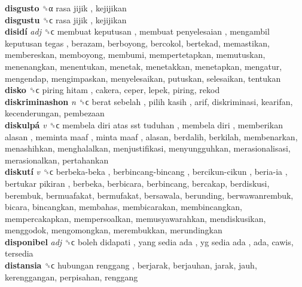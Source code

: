 \textbf{disgusto} ␝α   rasa jijik , kejijikan  \\
\textbf{disgustu} ␝ϲ   rasa jijik , kejijikan  \\
\textbf{disidí} \emph{adj}  ␝ϲ   membuat keputusan ,  membuat penyelesaian ,  mengambil keputusan tegas , berazam, berboyong, bercokol, bertekad, memastikan, membereskan, memboyong, membumi, mempertetapkan, memutuskan, menenangkan, menentukan, menetak, menetakkan, menetapkan, mengatur, mengendap, mengimpaskan, menyelesaikan, putuskan, selesaikan, tentukan  \\
\textbf{disko} ␝ϲ   piring hitam , cakera, ceper, lepek, piring, rekod  \\
\textbf{diskriminashon} \emph{n}  ␝ϲ   berat sebelah ,  pilih kasih , arif, diskriminasi, kearifan, kecenderungan, pembezaan  \\
\textbf{diskulpá} \emph{v}  ␝ϲ   membela diri  atas sst tuduhan ,  membela diri ,  memberikan alasan ,  meminta maaf ,  minta maaf , alasan, berdalih, berkilah, membenarkan, menashihkan, menghalalkan, menjustifikasi, menyungguhkan, merasionalisasi, merasionalkan, pertahankan  \\
\textbf{diskutí} \emph{v}  ␝ϲ   berbeka-beka ,  berbincang-bincang ,  bercikun-cikun ,  beria-ia ,  bertukar pikiran , berbeka, berbicara, berbincang, bercakap, berdiskusi, berembuk, bermuafakat, bermufakat, bersawala, berunding, berwawanrembuk, bicara, bincangkan, membahas, membicarakan, membincangkan, mempercakapkan, mempersoalkan, memusyawarahkan, mendiskusikan, menggodok, mengomongkan, merembukkan, merundingkan  \\
\textbf{disponibel} \emph{adj}  ␝ϲ   boleh didapati ,  yang sedia ada ,  yg sedia ada , ada, cawis, tersedia  \\
\textbf{distansia} ␝ϲ   hubungan renggang , berjarak, berjauhan, jarak, jauh, kerenggangan, perpisahan, renggang  \\
